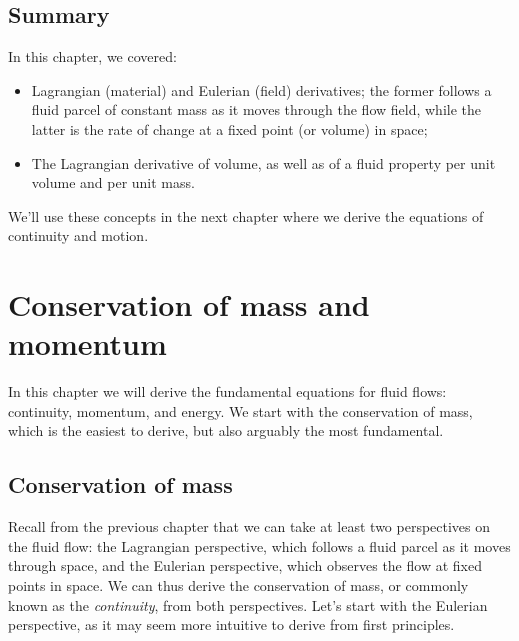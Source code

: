 \documentclass[12pt]{article}
\numberwithin{equation}{section}
\numberwithin{figure}{section}
\numberwithin{table}{section}
\begin{document}



\subsection*{Summary}

In this chapter, we covered:

\begin{itemize}
  \item Lagrangian (material) and Eulerian (field) derivatives;
  the former follows a fluid parcel of constant mass as it moves through
  the flow field, while the latter is the rate of change at a fixed point
  (or volume) in space;
  \item The Lagrangian derivative of volume, as well as of a fluid property per
  unit volume and per unit mass.
\end{itemize}

We'll use these concepts in the next chapter where we derive the equations of
continuity and motion.

\newpage
\section{Conservation of mass and momentum}
\label{sec:continuity_momentum}

In this chapter we will derive the fundamental equations for fluid flows:
continuity, momentum, and energy.
We start with the conservation of mass, which is the easiest to derive, but also
arguably the most fundamental.

\subsection{Conservation of mass}

Recall from the previous chapter that we can take at least two perspectives
on the fluid flow: the Lagrangian perspective, which follows a fluid parcel as it
moves through space, and the Eulerian perspective, which observes the flow at
fixed points in space.
We can thus derive the conservation of mass, or commonly known as the
\textit{continuity}, from both perspectives.
Let's start with the Eulerian perspective, as it may seem more intuitive to
derive from first principles.
\end{document}
